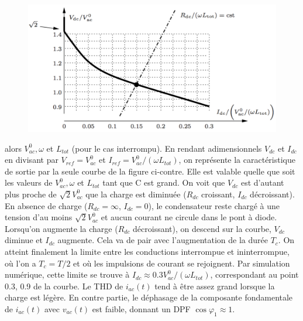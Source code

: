 			\begin{figure}
			\vspace{-5mm}
			\includegraphics[scale=0.3]{ch2/16}
			\end{figure} 
			alors $V_{ac}^0, \omega$ et $L_{tot}$ (pour le cas interrompu). En rendant adimensionnels $V_{dc}$ et $I_{dc}$ en divisant par $V_{ref} = V_{ac}^0$ et $I_{ref} = V_{ac}^0/(\omega L_{tot})$, on représente la caractéristique de sortie par la seule courbe de la figure ci-contre. Elle est valable quelle que soit les valeurs de $V_{ac}^0, \omega$ et $L_{tot}$ tant que C est grand. On voit que $V_{dc}$ est d'autant plus proche 
			\newpage 
			de $\sqrt{2}V_{ac}^0$ que la charge est diminuée ($R_{dc}$ croissant, $I_{dc}$ décroissant). En absence de charge ($R_{dc} = \infty$, $I_{dc} = 0$), le condensateur reste chargé à une tension d'au moins $\sqrt{2}V_{ac}^0$ et aucun courant ne circule dans le pont à diode. \\
			Lorsqu'on augmente la charge ($R_{dc}$ décroissant), on descend sur la courbe, $V_{dc}$ diminue et $I_{dc}$ augmente. Cela va de pair avec l'augmentation de la durée $T_c$. On atteint finalement la limite entre les conductions interrompue et ininterrompue, où l'on a $T_c = T/2$ et où les impulsions de courant se rejoignent. Par simulation numérique, cette limite se trouve à $I_{dc} \approx 0.3 V_{ac}^0/(\omega L_{tot})$, correspondant au point {0.3, 0.9} de la courbe. Le THD de $i_{ac}(t)$ tend à être assez grand lorsque la charge est légère. En contre partie, le déphasage de la composante fondamentale de $i_{ac}(t)$ avec $v_{ac}(t)$ est faible, donnant un DPF $\cos \varphi _1 \approx 1$. 
			
